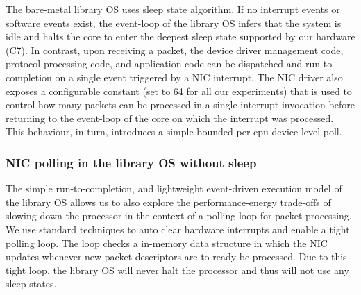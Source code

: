 The bare-metal library OS uses sleep state algorithm. If no interrupt events or software events exist, the event-loop of the library OS infers that the system is idle and halts the core to enter the deepest sleep state supported by our hardware (C7). In contrast, upon receiving a packet, the device driver management code, protocol processing code, and application code can be dispatched and run to completion on a single event triggered by a NIC interrupt. The NIC driver also exposes a configurable constant (set to 64 for all our experiments) that is used to control how many packets can be processed in a single interrupt invocation before returning to the event-loop of the core on which the interrupt was processed. This behaviour, in turn, introduces a simple bounded per-cpu device-level poll. %
\subsubsection{NIC polling in the library OS without sleep}
The simple run-to-completion, and lightweight event-driven execution model of the library OS allows us to also explore the performance-energy trade-offs of slowing down the processor in the context of a polling loop for packet processing. We use standard techniques to auto clear hardware interrupts and enable a tight polling loop. The loop checks a in-memory data structure in which the NIC updates whenever new packet descriptors are to ready be processed. Due to this tight loop, the library OS will never halt the processor and thus will not use any sleep states.



